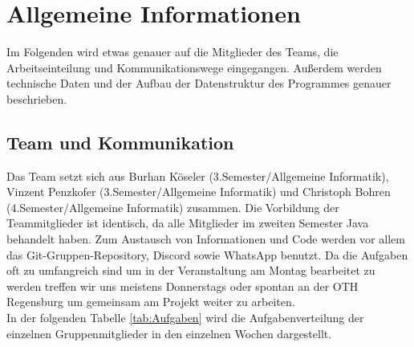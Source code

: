 \documentclass[12pt,a4paper,bibliography=totocnumbered,listof=totocnumbered,ngerman]{scrartcl}
\begin{document}
\newpage
\section{Allgemeine Informationen}
Im Folgenden wird etwas genauer auf die Mitglieder des Teams, die Arbeitseinteilung und Kommunikationswege eingegangen.
Außerdem werden technische Daten und der Aufbau der Datenstruktur des Programmes genauer beschrieben.
\subsection{Team und Kommunikation}
Das Team setzt sich aus Burhan Köseler (3.Semester/Allgemeine Informatik), Vinzent Penzkofer (3.Semester/Allgemeine Informatik) und Christoph Bohren (4.Semester/Allgemeine Informatik) zusammen.
Die Vorbildung der Teammitglieder ist identisch, da alle Mitglieder im zweiten Semester Java behandelt haben.
Zum Austausch von Informationen und Code werden vor allem das Git-Gruppen-Repository, Discord\label{Discord} sowie WhatsApp\label{WhatsApp} benutzt.
Da die Aufgaben oft zu umfangreich sind um in der Veranstaltung am Montag bearbeitet zu werden treffen wir uns meistens Donnerstags oder spontan an der OTH Regensburg um gemeinsam am Projekt weiter zu arbeiten.\\
In der folgenden Tabelle \ref{tab:Aufgaben} wird die Aufgabenverteilung der einzelnen Gruppenmitglieder in den einzelnen Wochen dargestellt.
\end{document}
